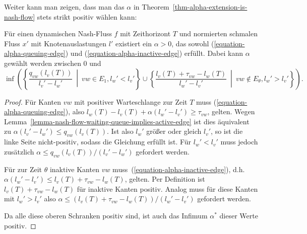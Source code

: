Weiter kann man zeigen, dass man das $\alpha$ in Theorem~\ref{thm-alpha-extension-is-nash-flow} stets strikt positiv wählen kann:
\begin{proposition}
	Für einen dynamischen Nash-Fluss $f$ mit Zeithorizont $T$ und normierten schmalen Fluss $x'$ mit Knotenauslastungen $l'$ existiert ein $\alpha>0$, das sowohl (\ref{equation-alpha-queuing-edge}) und (\ref{equation-alpha-inactive-edge}) erfüllt.
	Dabei kann $\alpha$ gewählt werden zwischen $0$ und \[
	\inf\left(\left\{ \frac{q_{vw}(l_v(T))}{l_v' - l_w'} ~\middle|~ vw\in E_1, l_w' < l_v' \right\} \cup \left\{ \frac{l_v(T) + \tau_{vw} -l_w(T)}{l_w' - l_v'} ~\middle|~ vw\notin E_\theta, l_w' > l_v' \right\}\right).
	\]
\end{proposition}
\begin{proof}
	Für Kanten $vw$ mit positiver Warteschlange zur Zeit $T$ muss (\ref{equation-alpha-queuing-edge}), also $l_w(T) - l_v(T) + \alpha(l_w' - l_v') \geq \tau_{vw}$, gelten.
	Wegen Lemma~\ref{lemma-nash-flow-waiting-queue-implies-active-edge} ist dies äquivalent zu $\alpha(l_v' - l_w') \leq q_{vw}(l_v(T))$.
	Ist also $l_w'$ größer oder gleich $l_v'$, so ist die linke Seite nicht-positiv, sodass die Gleichung erfüllt ist.
	Für $l_w' < l_v'$ muss jedoch zusätzlich $\alpha\leq q_{vw}(l_v(T)) / (l_v' - l_w')$ gefordert werden.
	
	Für zur Zeit $\theta$ inaktive Kanten $vw$ muss~(\ref{equation-alpha-inactive-edge}), d.h. $\alpha(l_w' -l_v') \leq l_v(T) + \tau_{vw} - l_w(T)$, gelten.
	Per Definition ist $l_v(T) + \tau_{vw} - l_w(T)$ für inaktive Kanten positiv.
	Analog muss für diese Kanten mit $l_w' > l_v'$ also $\alpha \leq (l_v(T) + \tau_{vw} -l_w(T))/(l_w' - l_v')$ gefordert werden.
	
	Da alle diese oberen Schranken positiv sind, ist auch das Infimum $\alpha^*$ dieser Werte positiv.
\end{proof}
